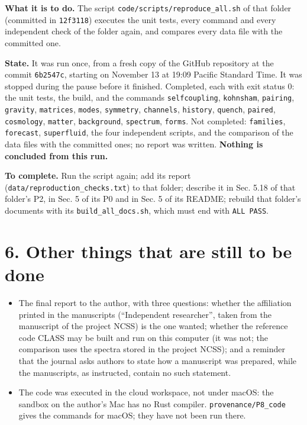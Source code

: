\documentclass[
  10pt,
]{article}
\providecommand{\tightlist}{%
  \setlength{\itemsep}{0pt}\setlength{\parskip}{0pt}}
\begin{document}
\textbf{What it is to do.} The script
\texttt{code/scripts/reproduce\_all.sh} of that folder (committed in
\texttt{12f3118}) executes the unit tests, every command and every
independent check of the folder again, and compares every data file with
the committed one.

\textbf{State.} It was run once, from a fresh copy of the GitHub
repository at the commit \texttt{6b2547c}, starting on November 13 at
19:09 Pacific Standard Time. It was stopped during the pause before it
finished. Completed, each with exit status 0: the unit tests, the build,
and the commands \texttt{selfcoupling}, \texttt{kohnsham},
\texttt{pairing}, \texttt{gravity}, \texttt{matrices}, \texttt{modes},
\texttt{symmetry}, \texttt{channels}, \texttt{history}, \texttt{quench},
\texttt{paired}, \texttt{cosmology}, \texttt{matter},
\texttt{background}, \texttt{spectrum}, \texttt{forms}. Not completed:
\texttt{families}, \texttt{forecast}, \texttt{superfluid}, the four
independent scripts, and the comparison of the data files with the
committed ones; no report was written. \textbf{Nothing is concluded from
this run.}

\textbf{To complete.} Run the script again; add its report
(\texttt{data/reproduction\_checks.txt}) to that folder; describe it in
Sec. 5.18 of that folder's P2, in Sec. 5 of its P0 and in Sec. 5 of its
README; rebuild that folder's documents with its
\texttt{build\_all\_docs.sh}, which must end with \texttt{ALL\ PASS}.

\hypertarget{other-things-that-are-still-to-be-done}{%
\section{6. Other things that are still to be
done}\label{other-things-that-are-still-to-be-done}}

\begin{itemize}
\tightlist
\item
  The final report to the author, with three questions: whether the
  affiliation printed in the manuscripts (``Independent researcher'',
  taken from the manuscript of the project NCSS) is the one wanted;
  whether the reference code CLASS may be built and run on this computer
  (it was not; the comparison uses the spectra stored in the project
  NCSS); and a reminder that the journal asks authors to state how a
  manuscript was prepared, while the manuscripts, as instructed, contain
  no such statement.
\item
  The code was executed in the cloud workspace, not under macOS: the
  sandbox on the author's Mac has no Rust compiler.
  \texttt{provenance/P8\_code} gives the commands for macOS; they have
  not been run there.
\end{itemize}
\end{document}
